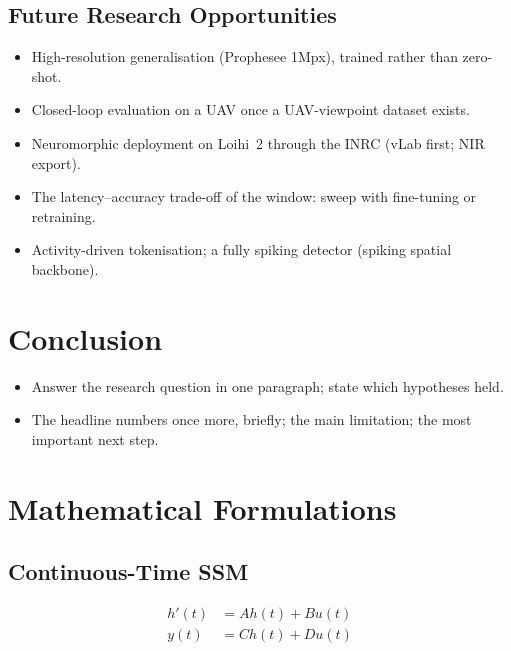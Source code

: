 \documentclass[11pt, a4paper]{report}
\newcounter{frontmatterpages}
\begin{document}
\section{Future Research Opportunities}
\label{sec:future_work}
\begin{itemize}
  \item High-resolution generalisation (Prophesee 1Mpx), trained rather than zero-shot.
  \item Closed-loop evaluation on a UAV once a UAV-viewpoint dataset exists.
  \item Neuromorphic deployment on Loihi~2 through the INRC (vLab first; NIR export).
  \item The latency--accuracy trade-off of the window: sweep with fine-tuning or retraining.
  \item Activity-driven tokenisation; a fully spiking detector (spiking spatial backbone).
\end{itemize}

\chapter{Conclusion}
\label{ch:conclusion}
\begin{itemize}
  \item Answer the research question in one paragraph; state which hypotheses held.
  \item The headline numbers once more, briefly; the main limitation; the most important next step.
\end{itemize}

\clearpage
{}
\setcounter{page}{\value{frontmatterpages}}




\appendix
\chapter{Mathematical Formulations}
\label{app:maths}
\section{Continuous-Time SSM}
\begin{align}
    h'(t) &= A h(t) + B u(t) \\
    y(t) &= C h(t) + D u(t)
\end{align}
\end{document}
